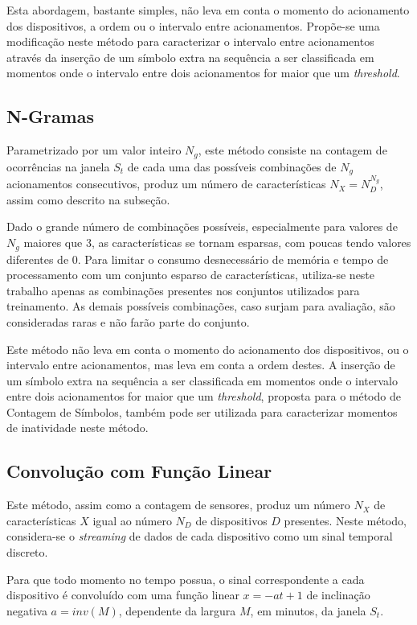 \documentclass[
	12pt,				%
	openright,			%
	twoside,			%
	a4paper,			%
	english,			%
	spanish,			%
	brazil,				%
	]{abntex2}\usepackage[]{graphicx}\usepackage[]{color}
\begin{document}
Esta abordagem, bastante simples, não leva em conta o momento do acionamento dos dispositivos, a ordem ou o intervalo entre acionamentos. Propõe-se uma modificação neste método para caracterizar o intervalo entre acionamentos através da inserção de um símbolo extra na sequência a ser classificada em momentos onde o intervalo entre dois acionamentos for maior que um \textit{threshold}.

\subsection{N-Gramas}

Parametrizado por um valor inteiro $N_g$, este método consiste na contagem de ocorrências na janela $S_t$ de cada uma das possíveis combinações de $N_g$ acionamentos consecutivos, produz um número de características $N_X = N_{D}^{N_g}$, assim como descrito na subseção.

Dado o grande número de combinações possíveis, especialmente para valores de $N_g$ maiores que $3$, as características se tornam esparsas, com poucas tendo valores diferentes de $0$. Para limitar o consumo desnecessário de memória e tempo de processamento com um conjunto esparso de características, utiliza-se neste trabalho apenas as combinações presentes nos conjuntos utilizados para treinamento. As demais possíveis combinações, caso surjam para avaliação, são consideradas raras e não farão parte do conjunto.

Este método não leva em conta o momento do acionamento dos dispositivos, ou o intervalo entre acionamentos, mas leva em conta a ordem destes. A inserção de um símbolo extra na sequência a ser classificada em momentos onde o intervalo entre dois acionamentos for maior que um \textit{threshold}, proposta para o método de Contagem de Símbolos, também pode ser utilizada para caracterizar momentos de inatividade neste método.

\subsection{Convolução com Função Linear}

Este método, assim como a contagem de sensores, produz um número $N_X$ de características $X$ igual ao número $N_D$ de dispositivos $D$ presentes. Neste método, considera-se o \textit{streaming} de dados de cada dispositivo como um sinal temporal discreto.

Para que todo momento no tempo possua, o sinal correspondente a cada dispositivo é convoluído com uma função linear $x = -at+1$ de inclinação negativa $a = inv(M)$, dependente da largura $M$, em minutos, da janela $S_t$.
\end{document}
